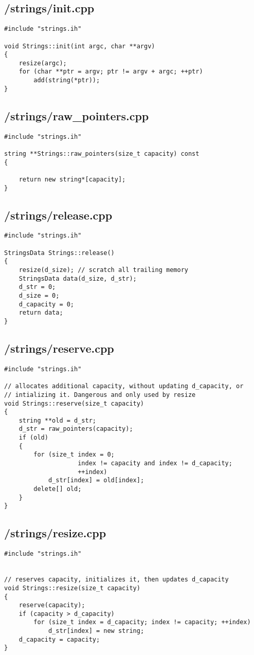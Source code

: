 \documentclass{article}
\begin{document}
\subsection*{/strings/init.cpp}
\begin{verbatim}
#include "strings.ih"

void Strings::init(int argc, char **argv)
{
    resize(argc);
    for (char **ptr = argv; ptr != argv + argc; ++ptr)
        add(string(*ptr));
}
\end{verbatim}
\subsection*{/strings/raw\_pointers.cpp}
\begin{verbatim}
#include "strings.ih"

string **Strings::raw_pointers(size_t capacity) const
{

    return new string*[capacity];
}
\end{verbatim}
\subsection*{/strings/release.cpp}
\begin{verbatim}
#include "strings.ih"

StringsData Strings::release()
{
    resize(d_size); // scratch all trailing memory
    StringsData data(d_size, d_str);
    d_str = 0;
    d_size = 0;
    d_capacity = 0;
    return data;
}
\end{verbatim}
\subsection*{/strings/reserve.cpp}
\begin{verbatim}
#include "strings.ih"

// allocates additional capacity, without updating d_capacity, or
// intializing it. Dangerous and only used by resize
void Strings::reserve(size_t capacity)
{
    string **old = d_str;
    d_str = raw_pointers(capacity);
    if (old)
    {
        for (size_t index = 0; 
                    index != capacity and index != d_capacity; 
                    ++index)
            d_str[index] = old[index];
        delete[] old;
    }
}

\end{verbatim}
\subsection*{/strings/resize.cpp}
\begin{verbatim}
#include "strings.ih"


// reserves capacity, initializes it, then updates d_capacity
void Strings::resize(size_t capacity)
{
    reserve(capacity);
    if (capacity > d_capacity)
        for (size_t index = d_capacity; index != capacity; ++index)
            d_str[index] = new string;
    d_capacity = capacity;  
}
\end{verbatim}
\end{document}
